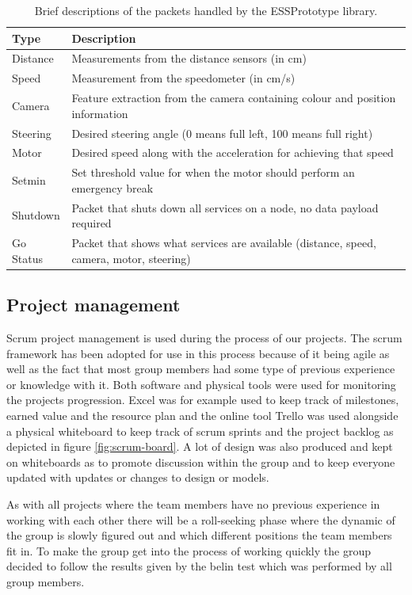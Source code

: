 \documentclass[11pt, titlepage]{article} %
\begin{document}
\begin{table}
  \caption{Brief descriptions of the packets handled by the ESSPrototype library.}
  \label{tab:packets}
  \centering
  \begin{tabular}{|l|l|} \hline
    \textbf{Type} & \textbf{Description}  \\ \hline
    Distance & Measurements from the distance sensors (in cm) \\ \hline
    Speed & Measurement from the speedometer (in cm/s) \\ \hline
    Camera & Feature extraction from the camera containing colour and position information  \\ \hline
    Steering & Desired steering angle (0 means full left, 100 means full right)  \\ \hline
    Motor & Desired speed along with the acceleration for achieving that speed \\ \hline
    Setmin & Set threshold value for when the motor should perform an emergency break  \\ \hline
    Shutdown & Packet that shuts down all services on a node, no data payload required  \\ \hline
    Go Status & Packet that shows what services are available (distance, speed, camera, motor, steering)  \\ \hline
     \end{tabular}
\end{table}

\subsection{Project management}
Scrum project management is used during the process of our projects.
The scrum framework has been adopted for use in this process because of it being agile as well as the fact that most group members had some type of previous experience or knowledge with it. Both software and physical tools were used for monitoring the projects progression. Excel was for example used to keep track of milestones, earned value and the resource plan and the online tool Trello was used alongside a physical whiteboard to keep track of scrum sprints and the project backlog as depicted in figure \ref{fig:scrum-board}. A lot of design was also produced and kept on whiteboards as to promote discussion within the group and to keep everyone updated with updates or changes to design or models.

As with all projects where the team members have no previous experience in working with each other there will be a roll-seeking phase where the dynamic of the group is slowly figured out and which different positions the team members fit in. To make the group get into the process of working quickly the group decided to follow the results given by the belin test which was performed by all group members.
\end{document}
